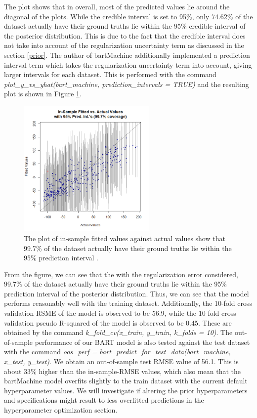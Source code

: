 \documentclass{usiinftr}
\begin{document}
The plot shows that in overall, most of the predicted values lie around the diagonal of the plots. While the credible interval is set to 95\%, only 74.62\% of the dataset actually have their ground truths lie within the 95\% credible interval of the posterior distribution. This is due to the fact that the credible interval does not take into account of the regularization uncertainty term as discussed in the section \ref{prior}. The author of bartMachine additionally implemented a prediction interval term which takes the regularization uncertainty term into account, giving larger intervals for each dataset. This is performed with the command \textit{plot\_y\_vs\_yhat(bart\_machine, prediction\_intervals = TRUE)} and the resulting plot is shown in Figure \ref{PI}.

\begin{figure}[h!] 
\centering
\includegraphics[width=0.6\textwidth]{images/PI.png}
\caption{The plot of in-sample fitted values against actual values show that 99.7\% of the dataset actually have their ground truths lie within the 95\% prediction interval .}
\label{PI}
\end{figure}

From the figure, we can see that the with the regularization error considered, 99.7\% of the dataset actually have their ground truths lie within the 95\% prediction interval of the posterior distribution. Thus, we can see that the model performs reasonably well with the training dataset. Additionally, the 10-fold cross validation RSME of the model is observed to be 56.9, while the 10-fold cross validation pseudo R-squared of the model is observed to be 0.45. These are obtained by the command \textit{k\_fold\_cv(x\_train, y\_train, k\_folds = 10)}. The out-of-sample performance of our BART model is also tested against the test dataset with the command \textit{oos\_perf = bart\_predict\_for\_test\_data(bart\_machine, x\_test, y\_test)}. We obtain an out-of-sample test RMSE value of 56.1. This is about 33\% higher than the in-sample-RMSE values, which also mean that the bartMachine model overfits slightly to the train dataset with the current default hyperparameter values. We will investigate if altering the prior hyperparameters and specifications might result to less overfitted predictions in the hyperparameter optimization section.
\end{document}
